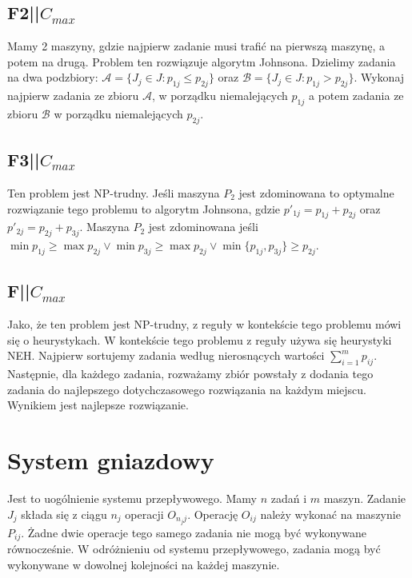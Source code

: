 \documentclass{../notatki}
\begin{document}
\subsection{F2||\texorpdfstring{$C_{max}$}{Cmax}}

Mamy 2 maszyny, gdzie najpierw zadanie musi trafić na pierwszą maszynę,
a potem na drugą. Problem ten rozwiązuje algorytm Johnsona. Dzielimy
zadania na dwa podzbiory: $\mathcal{A} = \{J_j \in J : p_{1j} \le p_{2j}\}$
oraz $\mathcal{B} =\{J_j \in J: p_{1j} > p_{2j}\}$. Wykonaj najpierw zadania
ze zbioru $\mathcal{A}$, w porządku niemalejących $p_{1j}$ a potem
zadania ze zbioru $\mathcal{B}$ w porządku niemalejących $p_{2j}$.

\subsection{F3||\texorpdfstring{$C_{max}$}{Cmax}}

Ten problem jest NP-trudny. Jeśli maszyna $P_2$ jest zdominowana to optymalne
rozwiązanie tego problemu to algorytm Johnsona, gdzie $p'_{1j} =
p_{1j} + p_{2j}$ oraz $p'_{2j} = p_{2j} + p_{3j}$. Maszyna $P_2$ jest
zdominowana jeśli
$\min p_{1j} \ge \max p_{2j} \vee \min p_{3j} \ge \max p_{2j} \vee
\min\{p_{1j},p_{3j}\} \ge p_{2j}$.

\subsection{F||\texorpdfstring{$C_{max}$}{Cmax}}

Jako, że ten problem jest NP-trudny, z reguły w kontekście tego problemu
mówi się o heurystykach. W kontekście tego problemu z reguły używa
się heurystyki NEH. Najpierw sortujemy zadania według nierosnących wartości
$\sum_{i=1}^m p_{ij}$. Następnie, dla każdego zadania, rozważamy zbiór
powstały z dodania tego zadania do najlepszego dotychczasowego rozwiązania na
każdym miejscu. Wynikiem jest najlepsze rozwiązanie.

\section{System gniazdowy}

Jest to uogólnienie systemu przepływowego. Mamy $n$ zadań i $m$ maszyn.
Zadanie $J_j$ składa się z ciągu $n_j$ operacji $O_{n_j j}$. Operację $O_{ij}$
należy wykonać na maszynie $P_{ij}$. Żadne dwie operacje tego samego zadania
nie mogą być wykonywane równocześnie. W odróżnieniu od systemu przepływowego,
zadania mogą być wykonywane w dowolnej kolejności na każdej maszynie.
\end{document}
